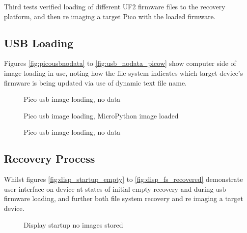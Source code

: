 Third tests verified loading of different UF2 firmware files to the recovery platform, and then re imaging a target Pico with the loaded firmware.

\clearpage
\subsection{USB Loading}
Figures \autoref{fig:picousbnodata} to \autoref{fig:usb_nodata_picow} show computer side of image loading in use, noting how the file system indicates which target device's firmware is being updated via use of dynamic text file name.

\begin{figure}[ht]
	\centering
	\caption{Pico \gls{usb} image loading, no data}
	\label{fig:picousbnodata}
\end{figure}

\begin{figure}[ht]
	\centering
	\caption{Pico \gls{usb} image loading, MicroPython image loaded}
	\label{fig:picousbdata}
\end{figure}

\begin{figure}[ht]
	\centering
	\caption{Pico \gls{usb} image loading, no data}
	\label{fig:usb_nodata_picow}
\end{figure}

\clearpage
\subsection{Recovery Process}
Whilst figures \autoref{fig:disp_startup_empty} to \autoref{fig:disp_fs_recovered} demonstrate user interface on device at states of initial empty recovery and during \gls{usb} firmware loading, and further both file system recovery and re imaging a target device.

\begin{figure}[ht]
	\centering
	\caption{Display startup no images stored}
	\label{fig:disp_startup_empty}
\end{figure}

